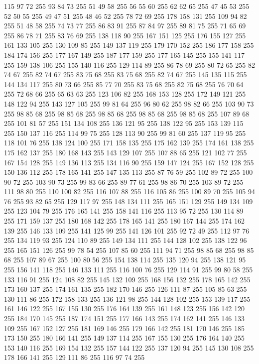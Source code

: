 115 97 72 255 93 84 73 255 51 49 58 255 56 55 60 255 62 62 65 255 47 45 53 255 52 50 55 255 49 47 51 255 48 46 52 255 78 72 69 255 178 158 131 255 109 94 82 255 51 48 58 255 74 73 77 255 86 83 91 255 87 84 97 255 89 81 75 255 71 65 69 255 86 78 71 255 83 76 69 255 138 118 90 255 167 151 125 255 176 155 127 255 161 133 105 255 130 109 85 255 149 137 119 255 179 170 152 255 186 177 158 255 184 174 156 255 177 167 149 255 187 177 159 255 177 165 145 255 155 141 117 255 159 138 106 255 155 140 116 255 129 114 89 255 86 78 69 255 80 72 65 255 82 74 67 255 82 74 67 255 83 75 68 255 83 75 68 255 82 74 67 255 145 135 115 255 144 134 117 255 80 73 66 255 85 77 70 255 83 75 68 255 82 75 68 255 76 70 64 255 72 68 66 255 65 63 63 255 123 106 82 255 168 153 128 255 172 149 121 255 148 122 94 255 143 127 105 255 99 81 64 255 96 80 62 255 98 82 66 255 103 90 73 255 98 85 68 255 98 85 68 255 98 85 68 255
98 85 68 255 98 85 68 255 107 89 68 255 101 81 57 255 151 134 108 255 136 121 95 255 138 122 95 255 153 139 115 255 150 137 116 255 114 99 75 255 128 113 90 255 99 81 60 255 137 119 95 255 118 101 76 255 138 124 100 255 171 158 135 255 175 162 139 255 174 161 138 255 175 162 137 255 180 168 143 255 143 129 107 255 107 88 65 255 121 102 77 255 167 154 128 255 149 136 113 255 134 116 90 255 159 147 124 255 167 152 128 255 150 136 112 255 178 165 141 255 147 135 113 255 87 76 59 255 102 89 72 255 100 90 72 255 103 90 73 255 99 83 66 255 89 77 61 255 98 86 70 255 103 89 72 255 111 98 80 255 110 100 82 255 116 107 88 255 116 105 86 255 100 89 70 255 105 94 76 255 93 82 65 255 129 117 97 255 148 134 111 255 165 151 129 255 149 134 109 255 123 104 79 255 176 165 141 255 158 141 116 255 113 95 72 255 130 114 89 255 171 159 137 255 180 168 142 255 178 165 141 255 180 167 144 255 174 162 139 255 146 133 109 255 141 125 99 255 141 126 101 255 92 72 49 255
112 97 76 255 134 119 93 255 124 110 89 255 149 134 111 255 144 128 102 255 138 122 96 255 165 151 126 255 99 78 54 255 107 85 60 255 111 94 71 255 98 85 68 255 98 85 68 255 107 89 67 255 100 80 56 255 154 138 114 255 135 120 94 255 138 121 95 255 156 141 118 255 146 133 111 255 116 100 76 255 129 114 91 255 99 80 58 255 133 116 91 255 124 108 82 255 145 132 109 255 168 156 132 255 178 165 142 255 173 160 137 255 174 161 135 255 182 170 146 255 126 111 87 255 105 85 63 255 130 111 86 255 172 158 133 255 136 121 98 255 144 128 102 255 153 139 117 255 161 146 122 255 167 155 130 255 176 164 139 255 161 148 123 255 156 142 120 255 184 170 145 255 187 174 151 255 177 166 143 255 174 162 141 255 146 133 109 255 167 152 127 255 181 169 146 255 179 166 142 255 181 170 146 255 185 173 150 255 180 166 141 255 149 137 114 255 167 155 130 255 176 164 140 255 153 140 116 255 169 154 132 255 157 144 122 255 137 120 94 255 145 130 108 255 178 166 141 255 129 111 86 255 116 97 74 255
